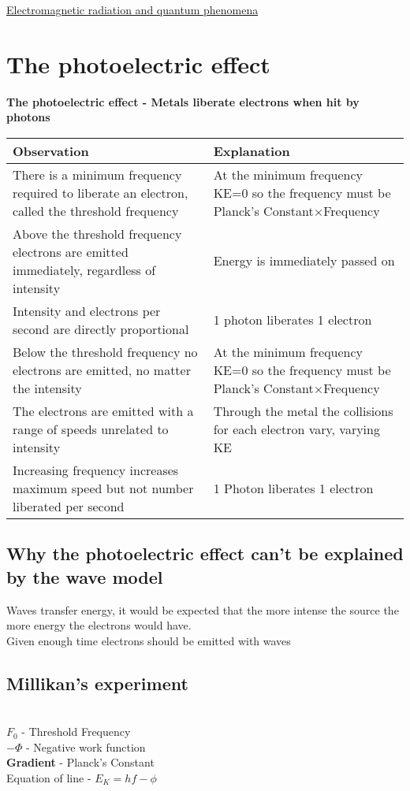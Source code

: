 \documentclass{article}[18pt]
\begin{document}
\begin{center}
\underline{\huge Electromagnetic radiation and quantum phenomena}
\end{center}
\section{The photoelectric effect}
\textbf{The photoelectric effect - Metals liberate electrons when hit by photons}\\
\begin{tabularx}{\textwidth}{|X|X|}
\hline
\textbf{Observation}&\textbf{Explanation}\\
\hline
There is a minimum frequency required to liberate an electron, called the threshold frequency&At the minimum frequency KE=0 so the frequency must be Planck's Constant$\times$Frequency\\
\hline
Above the threshold frequency electrons are emitted immediately, regardless of intensity&Energy is immediately passed on\\
\hline
Intensity and electrons per second are directly proportional&1 photon liberates 1 electron\\
\hline
Below the threshold frequency no electrons are emitted, no matter the intensity&At the minimum frequency KE=0 so the frequency must be Planck's Constant$\times$Frequency\\
\hline
The electrons are emitted with a range of speeds unrelated to intensity&Through the metal the collisions for each electron vary, varying KE\\
\hline
Increasing frequency increases maximum speed but not number liberated per second&1 Photon liberates 1 electron\\
\hline
\end{tabularx}
\subsection{Why the photoelectric effect can't be explained by the wave model}
Waves transfer energy, it would be expected that the more intense the source the more energy the electrons would have.\\
Given enough time electrons should be emitted with waves
\subsection{Millikan's experiment}
\\
$F_0$ - Threshold Frequency\\
$-\Phi$ - Negative work function\\
\textbf{Gradient} - Planck's Constant\\
Equation of line - $E_K=hf-\phi$ 
\newpage
\end{document}
